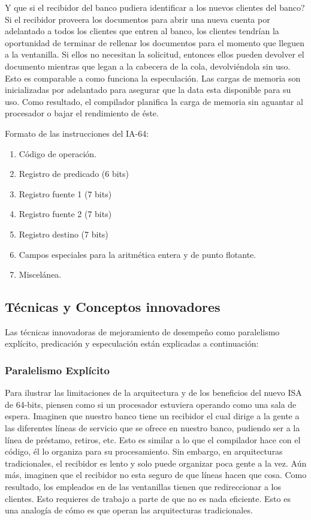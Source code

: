 \documentclass[11pt, conference]{IEEEtran}
\begin{document}
Y que si el recibidor del banco pudiera identificar a los nuevos clientes del banco? Si el recibidor proveera los documentos para abrir una nueva cuenta por adelantado a todos los clientes que entren al banco, los clientes tendrían la oportunidad de terminar de rellenar los documentos para el momento que lleguen a la ventanilla. Si ellos no necesitan la solicitud, entonces ellos pueden devolver el documento mientras que legan a la cabecera de la cola, devolviéndola sin uso. Esto es comparable a como funciona la especulación. Las cargas de memoria son inicializadas por adelantado para asegurar que la data esta disponible para su uso. Como resultado, el compilador planifica la carga de memoria sin aguantar al procesador o bajar el rendimiento de éste.


Formato de las instrucciones del IA-64:
\begin{enumerate}
	\item Código de operación.
	\item Registro de predicado (6 bits)
	\item Registro fuente 1 (7 bits)
	\item Registro fuente 2 (7 bits)
	\item Registro destino (7 bits)
	\item Campos especiales para la aritmética entera y de punto flotante.
	\item Miscelánea.
\end{enumerate}

\subsection{Técnicas y Conceptos innovadores}
Las técnicas innovadoras de mejoramiento de desempeño como paralelismo explícito, predicación y especulación están explicadas a continuación:
\subsubsection{Paralelismo Explícito}
Para ilustrar las limitaciones de la arquitectura y de los beneficios del nuevo ISA de 64-bits, piensen como si un procesador estuviera operando como una sala de espera. Imaginen que nuestro banco tiene un recibidor el cual dirige a la gente a las diferentes líneas de servicio que se ofrece en nuestro banco, pudiendo ser a la línea de préstamo, retiros, etc. Esto es similar a lo que el compilador hace con el código, él lo organiza para su procesamiento. Sin embargo, en arquitecturas tradicionales, el recibidor es lento y solo puede organizar poca gente a la vez. Aún más, imaginen que el recibidor no esta seguro de que líneas hacen que cosa. Como resultado, los empleados en de las ventanillas tienen que redireccionar a los clientes. Esto requieres de trabajo a parte de que no es nada eficiente. Esto es una analogía de cómo es que operan las arquitecturas tradicionales.
\end{document}
